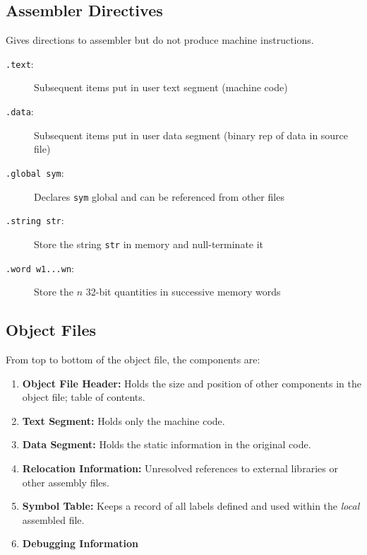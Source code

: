 \subsection{Assembler Directives}
Gives directions to assembler but do not produce machine instructions.
\begin{description}
    \item[\texttt{.text}:] Subsequent items put in user text segment (machine code)
    \item[\texttt{.data}:] Subsequent items put in user data segment (binary rep of data in source file)
    \item[\texttt{.global sym}:] Declares \texttt{sym} global and can be referenced from other files
    \item[\texttt{.string str}:] Store the string \texttt{str} in memory and null-terminate it
    \item[\texttt{.word w1...wn}:] Store the $n$ 32-bit quantities in successive memory words
\end{description}

\subsection{Object Files}
From top to bottom of the object file, the components are:
\begin{enumerate}
    \item \textbf{Object File Header:} Holds the size and position of other components in the object file; table of contents.
    \item \textbf{Text Segment:} Holds only the machine code.
    \item \textbf{Data Segment:} Holds the static information in the original code.
    \item \textbf{Relocation Information:} Unresolved references to external libraries or other assembly files.
    \item \textbf{Symbol Table:} Keeps a record of all labels defined and used within the \emph{local} assembled file.
    \item \textbf{Debugging Information} 
\end{enumerate}

